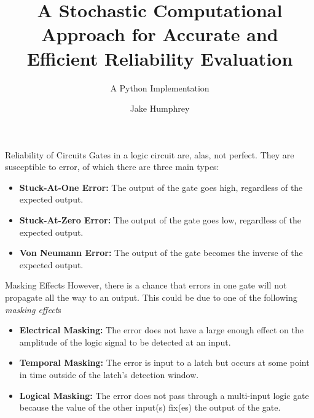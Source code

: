 \documentclass[12pt]{beamer}
\author{Jake Humphrey}
\title{A Stochastic Computational Approach for Accurate and Efficient Reliability Evaluation}
\subtitle{A Python Implementation}
\institute{Department of Electronic and Electrical Engineering\\
  Imperial College London\\
  \texttt{jbh111@ic.ac.uk}
}
\begin{document}
\begin{frame}[plain]
  \titlepage
\end{frame}

\begin{frame}{Reliability of Circuits}
Gates in a logic circuit are, alas, not perfect. They are susceptible to error, of which there are three main types:
\begin{itemize}
\item \textbf{Stuck-At-One Error:} The output of the gate goes high, regardless of the expected output.
\item \textbf{Stuck-At-Zero Error:} The output of the gate goes low, regardless of the expected output.
\item \textbf{Von Neumann Error:} The output of the gate becomes the inverse of the expected output.
\end{itemize}
\end{frame}

\begin{frame}{Masking Effects}
However, there is a chance that errors in one gate will not propagate all the way to an output. This could be due to one of the following \emph{masking effect}s
\begin{itemize}
\item \textbf{Electrical Masking:} The error does not have a large enough effect on the amplitude of the logic signal to be detected at an input.
\item \textbf{Temporal Masking:} The error is input to a latch but occurs at some point in time outside of the latch's detection window.
\item \textbf{Logical Masking:} The error does not pass through a multi-input logic gate because the value of the other input(s) fix(es) the output of the gate.
\end{itemize}
\end{frame}
\end{document}
